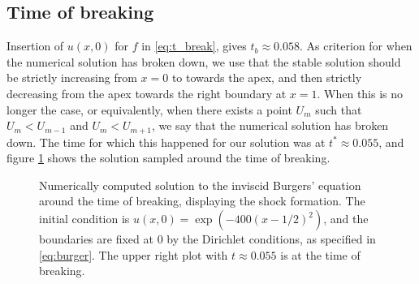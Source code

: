 %    

\subsection{Time of breaking}
Insertion of $u(x, 0)$ for $f$ in \eqref{eq:t_break}, 
gives $t_b \approx 0.058$. 
As criterion for when the numerical solution has broken down, 
we use that the stable solution should be strictly increasing from $x=0$ to towards the apex, 
and then strictly decreasing from the apex towards the right boundary at $x=1$. 
When this is no longer the case, 
or equivalently, 
when there exists a point $U_m$ such that $U_m < U_{m-1}$ and $U_m < U_{m+1}$, 
we say that the numerical solution has broken down. 
The time for which this happened for our solution was at $t^* \approx 0.055$, 
and figure \ref{fig:burgers-samples} shows the solution sampled around the time of breaking. 

\begin{figure}[ht]
    \centering
    
    \caption{
        Numerically computed solution to the inviscid Burgers' equation around the time of breaking, 
        displaying the shock formation. 
        The initial condition is $u\left(x, 0\right) = \exp\left(-400(x-1/2)^2\right)$, 
        and the boundaries are fixed at $0$ by the Dirichlet conditions, 
        as specified in \eqref{eq:burger}. 
        The upper right plot with $t \approx 0.055$ is at the time of breaking. 
    }
    \label{fig:burgers-samples}
\end{figure}
